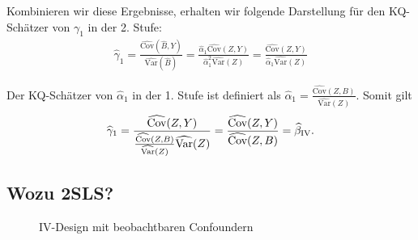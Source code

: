 \documentclass[
  a4paper,
  DIV=11,
  oneside]{scrreprt}
\begin{document}
Kombinieren wir diese Ergebnisse, erhalten wir folgende Darstellung für
den KQ-Schätzer von \(\gamma_1\) in der 2. Stufe: \begin{align}
  \widehat{\gamma}_1 = \frac{\widehat{\text{Cov}}(\widehat{B}, Y)}{\widehat{\text{Var}}(\widehat{B})} = \frac{\widehat{\alpha}_1 \widehat{\text{Cov}}(Z, Y)}{\widehat{\alpha}_1^2 \widehat{\text{Var}}(Z)} = \frac{\widehat{\text{Cov}}(Z, Y)}{\widehat{\alpha}_1 \widehat{\text{Var}}(Z)}
\end{align}

Der KQ-Schätzer von \(\widehat{\alpha}_1\) in der 1. Stufe ist definiert
als
\(\widehat{\alpha}_1 = \frac{\widehat{\text{Cov}}(Z, B)}{\widehat{\text{Var}}(Z)}\).
Somit gilt \begin{align}
  \widehat{\gamma}_1 = \frac{\widehat{\text{Cov}}(Z, Y)}{\frac{\widehat{\text{Cov}}(Z, B)}{\widehat{\text{Var}}(Z)} \widehat{\text{Var}}(Z)} = \frac{\widehat{\text{Cov}}(Z, Y)}{\widehat{\text{Cov}}(Z, B)} = \widehat{\beta}_{\textup{IV}}.\label{eq:equiviv}
\end{align}

\subsection{Wozu 2SLS?}\label{wozu-2sls}

\begin{figure}[t]


\caption{\label{fig-2SLSDAG}IV-Design mit beobachtbaren Confoundern}

\end{figure}%
\end{document}
